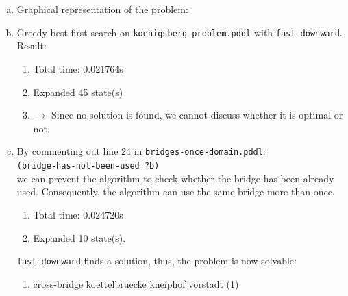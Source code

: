\documentclass{article} %
\begin{document}
\section{}
\begin{enumerate}[(a)]
    \item Graphical representation of the problem:\\[0.5em]
    \item Greedy best-first search on
    \texttt{koenigsberg-problem.pddl} with
    \texttt{fast-downward}. Result:
    \begin{enumerate}[]
        \item Total time: 0.021764s
        \item Expanded 45 state(s)
        \item $\rightarrow$ Since no solution is found,
        we cannot discuss whether it is optimal or not.
    \end{enumerate}
    \item By commenting out line 24 in
    \texttt{bridges-once-domain.pddl}:\\
    \texttt{(bridge-has-not-been-used ?b)}\\
    we can prevent the algorithm to check whether
    the bridge has been already used.
    Consequently, the algorithm can use the same
    bridge more than once.
    \begin{enumerate}[]
        \item Total time: 0.024720s
        \item Expanded 10 state(s).
    \end{enumerate}
    \texttt{fast-downward} finds a solution, thus,
    the problem is now solvable:
    \begin{enumerate}[]
        \item cross-bridge koettelbruecke kneiphof vorstadt (1)

\end{enumerate}
\end{enumerate}
\end{document}
